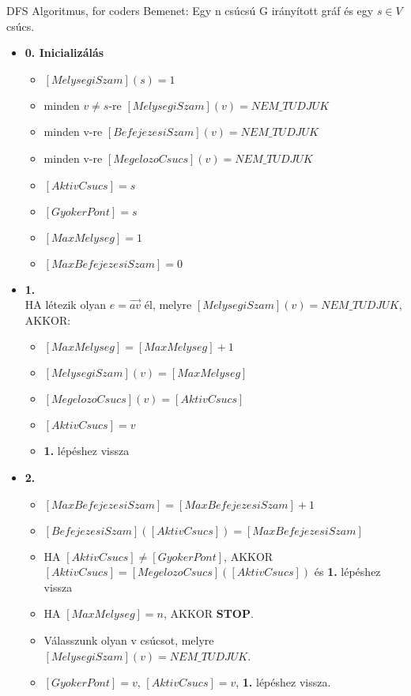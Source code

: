 \begin{tetel}{DFS Algoritmus, for coders}
Bemenet: Egy n csúcsú G irányított gráf és egy $s \in V$ csúcs.
\begin{itemize}
\item{\textbf{0. Inicializálás}}
  \begin{itemize}
  \item $[MelysegiSzam](s) = 1$
  \item minden $v \neq s$-re $[MelysegiSzam](v) = NEM\_TUDJUK$
  \item minden v-re $[BefejezesiSzam](v) = NEM\_TUDJUK$
  \item minden v-re $[MegelozoCsucs](v) = NEM\_TUDJUK$
  \item $[AktivCsucs]=s$
  \item $[GyokerPont] = s$
  \item $[MaxMelyseg] = 1$
  \item $[MaxBefejezesiSzam] = 0$
  \end{itemize}
\item{\textbf{1.}}
\\
HA létezik olyan $e = \overrightarrow{av}$ él, melyre $[MelysegiSzam](v) = NEM\_TUDJUK$, AKKOR:
	\begin{itemize}
	\item $[MaxMelyseg] = [MaxMelyseg] + 1$
	\item $[MelysegiSzam](v) = [MaxMelyseg]$
	\item $[MegelozoCsucs](v) = [AktivCsucs]$
	\item $[AktivCsucs] = v$
	\item \textbf{1.} lépéshez vissza
	\end{itemize}
\item{\textbf{2.}}
	\begin{itemize}
	\item $[MaxBefejezesiSzam] = [MaxBefejezesiSzam] + 1$
	\item $[BefejezesiSzam]([AktivCsucs]) = [MaxBefejezesiSzam]$
	\item HA $[AktivCsucs] \neq [GyokerPont]$, AKKOR $[AktivCsucs] = [MegelozoCsucs]([AktivCsucs])$ és \textbf{1.} lépéshez vissza
	\item HA $[MaxMelyseg] = n$, AKKOR \textbf{STOP}.
	\item Válasszunk olyan v csúcsot, melyre $[MelysegiSzam](v) = NEM\_TUDJUK$.
	\item $[GyokerPont] = v$, $[AktivCsucs] = v$, \textbf{1.} lépéshez vissza.
	\end{itemize}
\end{itemize}
\end{tetel}

